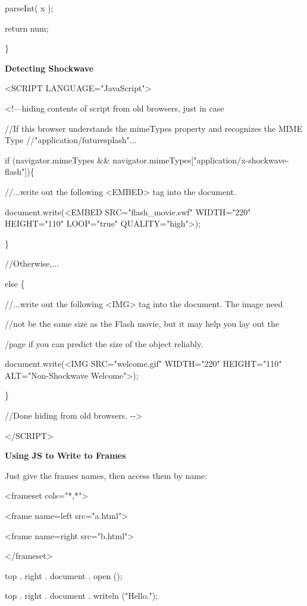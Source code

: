 \documentclass[
]{article}
\begin{document}
parseInt( x );

return num;

\}

\textbf{Detecting Shockwave}

\textless SCRIPT LANGUAGE="JavaScript"\textgreater{}

\textless!---hiding contents of script from old browsers, just in case

//If this browser understands the mimeTypes property and recognizes the
MIME Type //"application/futuresplash"...

if (navigator.mimeTypes \&\&
navigator.mimeTypes{[}"application/x-shockwave-flash"{]})\{

//...write out the following \textless EMBED\textgreater{} tag into the
document.

document.write(\textquotesingle\textless EMBED SRC="flash\_movie.swf"
WIDTH="220" HEIGHT="110" LOOP="true"
QUALITY="high"\textgreater\textquotesingle);

\}

//Otherwise,...

else \{

//...write out the following \textless IMG\textgreater{} tag into the
document. The image need

//not be the same size as the Flash movie, but it may help you lay out
the

/page if you can predict the size of the object reliably.

document.write(\textquotesingle\textless IMG SRC="welcome.gif"
WIDTH="220" HEIGHT="110" ALT="Non-Shockwave
Welcome"\textgreater\textquotesingle);

\}

//Done hiding from old browsers. -\/-\textgreater{}

\textless/SCRIPT\textgreater{}

\textbf{Using JS to Write to Frames}

Just give the frames names, then access them by name:

\textless frameset cols="*,*"\textgreater{}

\textless frame name=left src="a.html"\textgreater{}

\textless frame name=right src="b.html"\textgreater{}

\textless/frameset\textgreater{}

top . right . document . open ();

top . right . document . writeln ("Hello.");
\end{document}
